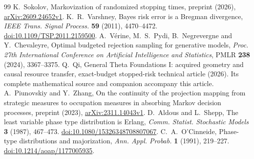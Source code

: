 \begin{thebibliography}{99}
 K.~Sokolov, Markovization of randomized stopping times, preprint (2026), \href{https://arxiv.org/abs/2609.24652v1}{arXiv:2609.24652v1}.
 K.~R.~Varshney, Bayes risk error is a Bregman divergence, \emph{IEEE Trans. Signal Process.} \textbf{59} (2011), 4470--4472. \href{https://doi.org/10.1109/TSP.2011.2159500}{doi:10.1109/TSP.2011.2159500}.
 A.~V\'erine, M.~S.~Pydi, B.~Negrevergne and Y.~Chevaleyre, Optimal budgeted rejection sampling for generative models, \emph{Proc. 27th International Conference on Artificial Intelligence and Statistics}, PMLR \textbf{238} (2024), 3367--3375.
 Q.~Qi, General Theta Foundations I: acquired geometry and causal resource transfer, exact-budget stopped-risk technical article (2026). Its complete mathematical source and companion accompany this article.
 A.~Piunovskiy and Y.~Zhang, On the continuity of the projection mapping from strategic measures to occupation measures in absorbing Markov decision processes, preprint (2023), \href{https://arxiv.org/abs/2311.14043v1}{arXiv:2311.14043v1}.
 D.~Aldous and L.~Shepp, The least variable phase type distribution is Erlang, \emph{Comm. Statist. Stochastic Models} \textbf{3} (1987), 467--473. \href{https://doi.org/10.1080/15326348708807067}{doi:10.1080/15326348708807067}.
 C.~A.~O'Cinneide, Phase-type distributions and majorization, \emph{Ann. Appl. Probab.} \textbf{1} (1991), 219--227. \href{https://doi.org/10.1214/aoap/1177005935}{doi:10.1214/aoap/1177005935}.
\end{thebibliography}
